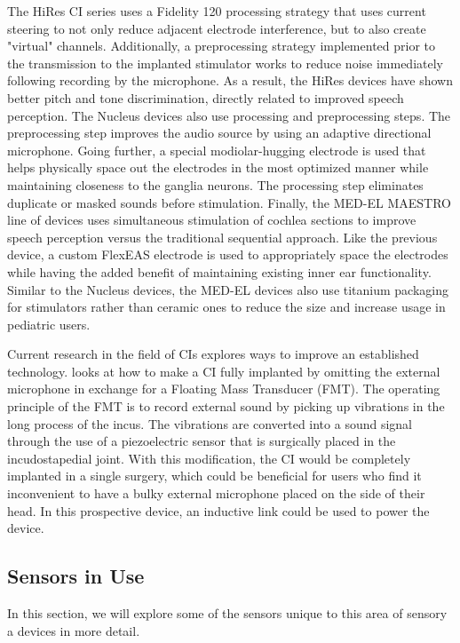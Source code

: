 The HiRes CI series uses a Fidelity 120 \parencite{advanced_bionics_fidelity120} processing strategy that uses current steering to not only reduce adjacent electrode interference, but to also create "virtual" channels. Additionally, a preprocessing strategy implemented prior to the transmission to the implanted stimulator works to reduce noise immediately following recording by the microphone. As a result, the HiRes devices have shown better pitch and tone discrimination, directly related to improved speech perception. The Nucleus devices also use processing and preprocessing steps. The preprocessing step improves the audio source by using an adaptive directional microphone. Going further, a special modiolar-hugging electrode is used that helps physically space out the electrodes in the most optimized manner while maintaining closeness to the ganglia neurons. The processing step eliminates duplicate or masked sounds before stimulation. Finally, the MED-EL MAESTRO line of devices uses simultaneous stimulation of cochlea sections to improve speech perception versus the traditional sequential approach. Like the previous device, a custom FlexEAS electrode is used to appropriately space the electrodes while having the added benefit of maintaining existing inner ear functionality. Similar to the Nucleus devices, the MED-EL devices also use titanium packaging for stimulators rather than ceramic ones to reduce the size and increase usage in pediatric users.

Current research in the field of CIs explores ways to improve an established technology. \textcite{esinger_sensor-actuator_2019} looks at how to make a CI fully implanted by omitting the external microphone in exchange for a Floating Mass Transducer (FMT). The operating principle of the FMT is to record external sound by picking up vibrations in the long process of the incus. The vibrations are converted into a sound signal through the use of a piezoelectric sensor that is surgically placed in the incudostapedial joint. With this modification, the CI would be completely implanted in a single surgery, which could be beneficial for users who find it inconvenient to have a bulky external microphone placed on the side of their head. In this prospective device, an inductive link could be used to power the device. 

\subsection{Sensors in Use}
\tab In this section, we will explore some of the sensors unique to this area of sensory a devices in more detail.

